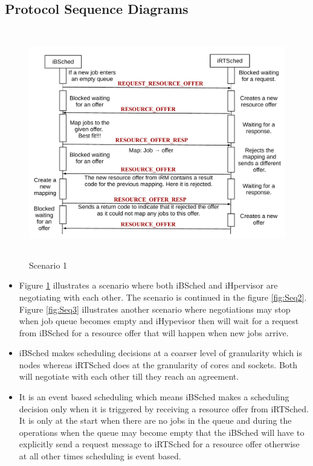 \subsection{Protocol Sequence Diagrams}
\begin{figure}[!t]
\centering
\includegraphics[width=1.0\textwidth, height=100mm]{./figures/scenario1.pdf}
\caption{Scenario 1}
\label{fig:Seq1}
\end{figure}
\begin{itemize}
\item Figure \ref{fig:Seq1} illustrates a scenario where both iBSched and iHpervisor are negotiating with each other. The scenario is continued in the figure \ref{fig:Seq2}. Figure \ref{fig:Seq3} illustrates another scenario where negotiations may stop when job queue becomes empty and iHypevisor then will wait for a request from iBSched for a resource offer that will happen when new jobs arrive.
\item iBSched makes scheduling decisions at a coarser level of granularity which is nodes whereas iRTSched does at the granularity of cores and sockets. Both will negotiate with each other till they reach an agreement.
\item It is an event based scheduling which means iBSched makes a scheduling decision only when it is triggered by receiving a resource offer from iRTSched. It is only at the start when there are no jobs in the queue and during the operations when the queue may become empty that the iBSched will have to explicitly send a request message to iRTSched for a resource offer otherwise at all other times scheduling is event based.
\end{itemize}
